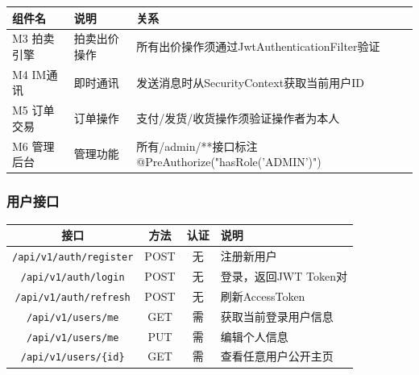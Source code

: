 \documentclass[12pt,a4paper]{ctexart}
\numberwithin{figure}{section}
\numberwithin{table}{section}
\begin{document}
\begin{center}
\renewcommand{\arraystretch}{1.3}
\begin{tabular}{|p{3cm}|p{4cm}|p{7cm}|}
\hline
\rowcolor{tableheader}
\textbf{组件名} & \textbf{说明} & \textbf{关系} \\
\hline
M3 拍卖引擎 & 拍卖出价操作 & 所有出价操作须通过JwtAuthenticationFilter验证 \\
\hline
M4 IM通讯 & 即时通讯 & 发送消息时从SecurityContext获取当前用户ID \\
\hline
M5 订单交易 & 订单操作 & 支付/发货/收货操作须验证操作者为本人 \\
\hline
M6 管理后台 & 管理功能 & 所有/admin/**接口标注@PreAuthorize("hasRole('ADMIN')") \\
\hline
\end{tabular}
\end{center}

\subsubsection{用户接口}

\begin{center}
\renewcommand{\arraystretch}{1.3}
\begin{tabular}{|c|c|c|p{5cm}|}
\hline
\rowcolor{tableheader}
\textbf{接口} & \textbf{方法} & \textbf{认证} & \textbf{说明} \\
\hline
\verb|/api/v1/auth/register| & POST & 无 & 注册新用户 \\
\hline
\verb|/api/v1/auth/login| & POST & 无 & 登录，返回JWT Token对 \\
\hline
\verb|/api/v1/auth/refresh| & POST & 无 & 刷新AccessToken \\
\hline
\verb|/api/v1/users/me| & GET & 需 & 获取当前登录用户信息 \\
\hline
\verb|/api/v1/users/me| & PUT & 需 & 编辑个人信息 \\
\hline
\verb|/api/v1/users/{id}| & GET & 需 & 查看任意用户公开主页 \\
\hline
\end{tabular}
\end{center}
\end{document}
